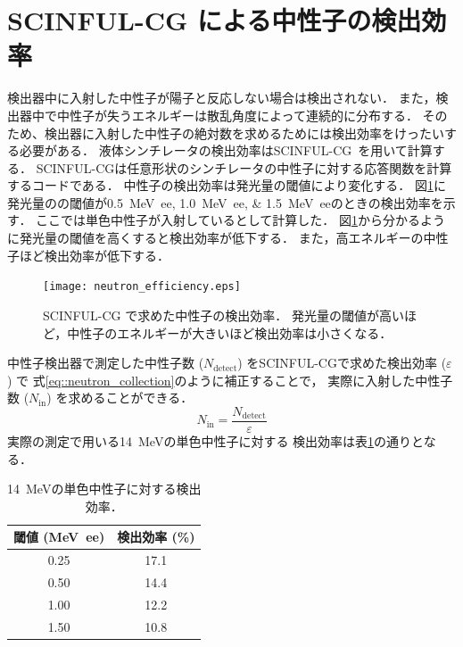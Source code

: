 \documentclass[../master]{subfiles}
\begin{document}
\section{SCINFUL-CG による中性子の検出効率}
検出器中に入射した中性子が陽子と反応しない場合は検出されない．
また，検出器中で中性子が失うエネルギーは散乱角度によって連続的に分布する．
そのため、検出器に入射した中性子の絶対数を求めるためには検出効率をけったいする必要がある．
液体シンチレータの検出効率はSCINFUL-CG~\cite{scinful-cg}を用いて計算する．
SCINFUL-CGは任意形状のシンチレータの中性子に対する応答関数を計算するコードである．
中性子の検出効率は発光量の閾値により変化する．
図\ref{fig::neutron_efficiency}に発光量のの閾値が\SIlist{0.5;1.0;1.5}{\mega\electronvolt ee}のときの検出効率を示す．
ここでは単色中性子が入射しているとして計算した．
図\ref{fig::neutron_efficiency}から分かるように発光量の閾値を高くすると検出効率が低下する．
また，高エネルギーの中性子ほど検出効率が低下する．
\begin{figure}
  \centering
  \texttt{[image: neutron\_efficiency.eps]}
  \caption[SCINFUL-CG で求めた中性子の検出効率．]
          {SCINFUL-CG で求めた中性子の検出効率．
          発光量の閾値が高いほど，中性子のエネルギーが大きいほど検出効率は小さくなる．}
  \label{fig::neutron_efficiency}
\end{figure}

中性子検出器で測定した中性子数 ($N_{\text{detect}}$) をSCINFUL-CGで求めた検出効率 ($\varepsilon$) で
式\eqref{eq::neutron_collection}のように補正することで，
実際に入射した中性子数 ($N_{\text{in}}$) を求めることができる．
\begin{equation}
  N_{\text{in}} = \frac{N_{\text{detect}}}{\varepsilon}
  \label{eq::neutron_collection}
\end{equation}
実際の測定で用いる\SI{14}{\mega\electronvolt}の単色中性子に対する
検出効率は表\ref{tab::neutron_efficiency}の通りとなる．
\begin{table}
  \centering
  \caption{\SI{14}{\mega\electronvolt}の単色中性子に対する検出効率．}
  \label{tab::neutron_efficiency}
  \begin{tabular}{cc}
    \toprule
    閾値 (\si{\mega\electronvolt ee}) & 検出効率 (\si{\percent}) \\
    \midrule
    0.25 & 17.1 \\
    0.50 & 14.4 \\
    1.00 & 12.2 \\
    1.50 & 10.8 \\
    \bottomrule
  \end{tabular}
\end{table}
\end{document}
